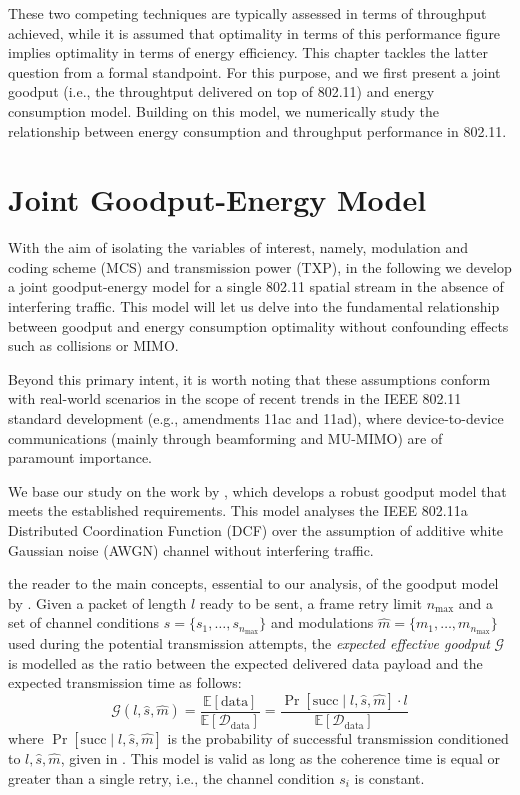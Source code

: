 \documentclass[twoside,nohyper]{tufte-book}
\theoremstyle{definition}
\theoremstyle{definition}
\theoremstyle{definition}
\theoremstyle{remark}
\begin{document}
These two competing techniques are typically assessed in terms of
throughput achieved, while it is assumed that optimality in terms of
this performance figure implies optimality in terms of energy
efficiency. This chapter tackles the latter question from a formal
standpoint. For this purpose, and we first present a joint goodput
(i.e., the throughtput delivered on top of 802.11) and energy
consumption model. Building on this model, we numerically study the
relationship between energy consumption and throughput performance in
802.11.

\section{Joint Goodput-Energy Model}\label{joint-goodput-energy-model}

With the aim of isolating the variables of interest, namely, modulation
and coding scheme (MCS) and transmission power (TXP), in the following
we develop a joint goodput-energy model for a single 802.11 spatial
stream in the absence of interfering traffic. This model will let us
delve into the fundamental relationship between goodput and energy
consumption optimality without confounding effects such as collisions or
MIMO.

Beyond this primary intent, it is worth noting that these assumptions
conform with real-world scenarios in the scope of recent trends in the
IEEE 802.11 standard development (e.g., amendments 11ac and 11ad), where
device-to-device communications (mainly through beamforming and MU-MIMO)
are of paramount importance.

\pagebreak We base our study on the work by
\citet{Qiao2002}\cite{Qiao2002}, which develops a robust goodput model
that meets the established requirements. This model analyses the IEEE
802.11a Distributed Coordination Function (DCF) over the assumption of
additive white Gaussian noise (AWGN) channel without interfering
traffic.

 the reader to the main concepts,
essential to our analysis, of the goodput model by \citet{Qiao2002}.
Given a packet of length \(l\) ready to be sent, a frame retry limit
\(n_\mathrm{max}\) and a set of channel conditions
\(\hat{s}=\{s_1, \ldots, s_{n_\mathrm{max}}\}\) and modulations
\(\hat{m}=\{m_1, \ldots, m_{n_\mathrm{max}}\}\) used during the
potential transmission attempts, the \emph{expected effective goodput}
\(\mathcal{G}\) is modelled as the ratio between the expected delivered
data payload and the expected transmission time as follows:
%
\begin{equation}
 \mathcal{G}(l, \hat{s}, \hat{m}) = \frac{{\mathbb E}\left[ \mathrm{data} \right]}{{\mathbb E}\left[ \mathcal{D}_\mathrm{data} \right]} = \frac{\Pr[\mathrm{succ} \mid l, \hat{s}, \hat{m}]\cdot l}{{\mathbb E}\left[ \mathcal{D}_\mathrm{data} \right]}
 \label{eq:goodput}
\end{equation}
%
where \(\Pr[\mathrm{succ} \mid l, \hat{s}, \hat{m}]\) is the probability
of successful transmission conditioned to \(l, \hat{s}, \hat{m}\), given
in \citet[Equation (5)]{Qiao2002}. This model is valid as long as the
coherence time is equal or greater than a single retry, i.e., the
channel condition \(s_i\) is constant.
\end{document}
